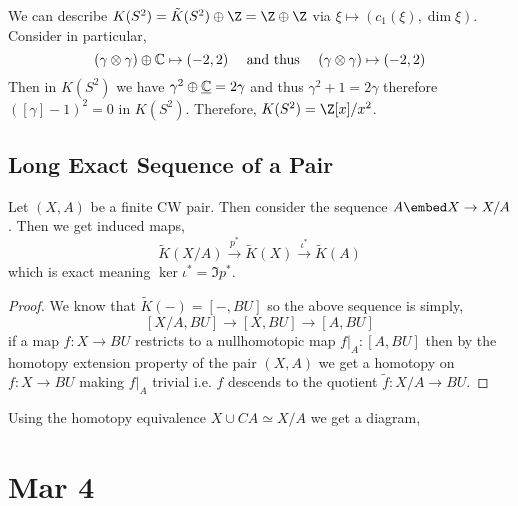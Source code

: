 \documentclass[12pt]{extarticle}
\begin{document}
\begin{rmk}
We can describe $K(S^2) = \tilde{K}(S^2) \oplus \Z = \Z \oplus \Z$ via $\xi \mapsto (c_1(\xi), \dim{\xi})$. Consider in particular,
\[ (\gamma \otimes \gamma) \oplus \mathbb{C} \mapsto (-2, 2) \quad \text{ and thus } \quad (\gamma \otimes \gamma) \mapsto (-2, 2) \]
Then in $K(S^2)$ we have $\gamma^2 \oplus \underline{\mathbb{C}} = 2 \gamma$ and thus $\gamma^2 + 1 = 2 \gamma$ therefore $([\gamma] - 1)^2 = 0$ in $K(S^2)$. Therefore, $K(S^2) = \Z[x]/x^2$. 
\end{rmk}

\subsection{Long Exact Sequence of a Pair}

\begin{lemma}
Let $(X, A)$ be a finite CW pair. Then consider the sequence $A \embed X \to X / A$. Then we get induced maps,
\[ \tilde{K}(X/A) \xrightarrow{p^*} \tilde{K}(X) \xrightarrow{\iota^*} \tilde{K}(A) \]
which is exact meaning $\ker{\iota^*} = \Im{p^*}$.
\end{lemma}

\begin{proof}
We know that $\tilde{K}(-) = [-, BU]$ so the above sequence is simply,
\[ [X/A, BU] \to [X, BU] \to [A, BU]  \]
if a map $f : X \to BU$ restricts to a nullhomotopic map $f|_A : [A, BU]$ then by the homotopy extension property of the pair $(X, A)$ we get a homotopy on $f : X \to BU$ making $f |_A$ trivial i.e. $f$ descends to the quotient $\tilde{f} : X / A \to BU$.  
\end{proof}

\begin{rmk}
Using the homotopy equivalence $X \cup CA \simeq X/A$ we get a diagram,
\begin{center}
\end{center}
\end{rmk}

\section{Mar 4}
\end{document}
